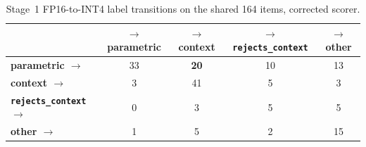 \documentclass{article} %
\begin{document}
\begin{table}[h]
\caption{Stage~1 FP16-to-INT4 label transitions on the shared 164 items, corrected scorer.}
\label{tab:transitions}
\centering\small
\begin{tabular}{lcccc}
\toprule
 & $\to$ parametric & $\to$ context & $\to$ \texttt{rejects\_context} & $\to$ other \\
\midrule
\textbf{parametric $\to$} & 33 & \textbf{20} & 10 & 13 \\
\textbf{context $\to$} & 3 & 41 & 5 & 3 \\
\textbf{\texttt{rejects\_context} $\to$} & 0 & 3 & 5 & 5 \\
\textbf{other $\to$} & 1 & 5 & 2 & 15 \\
\bottomrule
\end{tabular}
\end{table}



\end{document}
